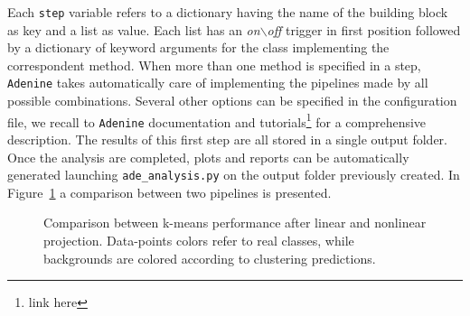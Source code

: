 \documentclass[twoside,11pt]{article}
\makeatletter
\newcommand{\ade}{\texttt{Adenine}\@\xspace}
\makeatother
\begin{document}
Each \texttt{step} variable refers to a dictionary having the name of the building block as key and a list as value. Each list has an \emph{on$\backslash$off} trigger in first position followed by a dictionary of keyword arguments for the class implementing the correspondent method. When more than one method is specified in a step, \ade takes automatically care of implementing the pipelines made by all possible combinations. Several other options can be specified in the configuration file, we recall to \ade documentation and tutorials\footnote{link here} for a comprehensive description. The results of this first step are all stored in a single output folder. Once the analysis are completed, plots and reports can be automatically generated launching \texttt{ade\_analysis.py} on the output folder previously created. In Figure~\ref{fig:scatter} a comparison between two pipelines is presented.

\begin{figure}[h!] 
    \centering
    \hfill%
    \caption{Comparison between k-means performance after linear and nonlinear projection. Data-points colors refer to real classes, while backgrounds are colored according to clustering predictions.}\label{fig:scatter}
\end{figure}




\end{document}
